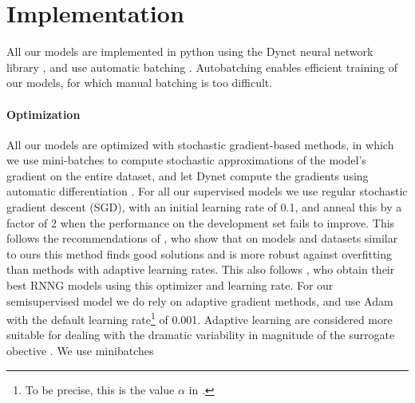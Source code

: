 \section{Implementation}
  All our models are implemented in python using the Dynet neural network library \citep{neubig2017dynet}, and use automatic batching \citep{neubig2017fly}. Autobatching enables efficient training of our models, for which manual batching is too difficult.

  \paragraph{Optimization}
    All our models are optimized with stochastic gradient-based methods, in which we use mini-batches to compute stochastic approximations of the model's gradient on the entire dataset, and let Dynet compute the gradients using automatic differentiation \citep{neubig2017dynet,baydin2018automatic}. For all our supervised models we use regular stochastic gradient descent (SGD), with an initial learning rate of 0.1, and anneal this by a factor of 2 when the performance on the development set fails to improve. This follows the recommendations of \citet{wilson2017marginal}, who show that on models and datasets similar to ours this method finds good solutions and is more robust against overfitting than methods with adaptive learning rates. This also follows \citet{dyer2016rnng}, who obtain their best RNNG models using this optimizer and learning rate. For our semisupervised model we do rely on adaptive gradient methods, and use Adam \citep{kingma2014adam} with the default learning rate\footnote{To be precise, this is the value $\alpha$ in \citet{kingma2014adam}.} of 0.001. Adaptive learning are considered more suitable for dealing with the dramatic variability in magnitude of the surrogate obective \citep{ranganath2014black,klein2018reinforce}. We use minibatches



